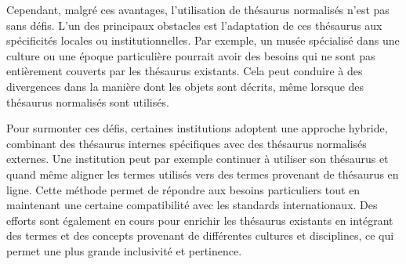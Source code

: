 Cependant, malgré ces avantages, l'utilisation de thésaurus normalisés n'est pas sans défis. L'un des principaux obstacles est l'adaptation de ces thésaurus aux spécificités locales ou institutionnelles. Par exemple, un musée spécialisé dans une culture ou une époque particulière pourrait avoir des besoins qui ne sont pas entièrement couverts par les thésaurus existants. Cela peut conduire à des divergences dans la manière dont les objets sont décrits, même lorsque des thésaurus normalisés sont utilisés. \newline

Pour surmonter ces défis, certaines institutions adoptent une approche hybride, combinant des thésaurus internes spécifiques avec des thésaurus normalisés externes. Une institution peut par exemple continuer à utiliser son thésaurus et quand même aligner les termes utilisés vers des termes provenant de thésaurus en ligne. Cette méthode permet de répondre aux besoins particuliers tout en maintenant une certaine compatibilité avec les standards internationaux. Des efforts sont également en cours pour enrichir les thésaurus existants en intégrant des termes et des concepts provenant de différentes cultures et disciplines, ce qui permet une plus grande inclusivité et pertinence.
